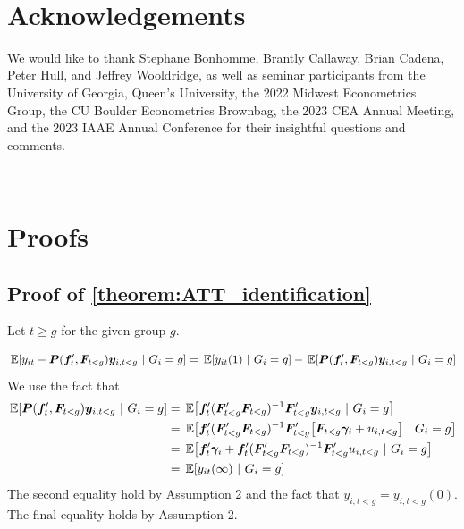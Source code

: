 \documentclass[12pt]{article}
\begin{document}
\newpage~\section*{Acknowledgements}

We would like to thank Stephane Bonhomme, Brantly Callaway, Brian Cadena, Peter Hull, and Jeffrey Wooldridge, as well as seminar participants from the University of Georgia, Queen's University, the 2022 Midwest Econometrics Group, the CU Boulder Econometrics Brownbag, the 2023 CEA Annual Meeting, and the 2023 IAAE Annual Conference for their insightful questions and comments.


\newpage~\appendix

\section{Proofs}\label{sec:proofs}

\subsection*{Proof of \autoref{theorem:ATT_identification}}

Let $t \geq g$ for the given group $g$.

\begin{equation*}
    \E{y_{it} - \bm P(\bm f_{t}', \bm F_{t < g}) \bm y_{i,t < g}}{G_i = g} = \E{y_{it}(1)}{G_i = g} - \E{\bm P(\bm f_{t}', \bm F_{t < g}) \bm y_{i,t < g}}{G_i = g} 
\end{equation*}
We use the fact that 
\begin{align*}
    \E{ \bm P(\bm f_{t}', \bm F_{t < g}) \bm y_{i,t < g} }{G_i = g} 
    &= \E{ \bm f_{t}' (\bm F_{t < g}' \bm F_{t < g})^{-1} \bm F_{t < g}' \bm y_{i,t < g} }{G_i = g} \\
    &= \E{ \bm f_{t}' (\bm F_{t < g}' \bm F_{t < g})^{-1} \bm F_{t < g}' \big[\bm F_{t < g} \bm \gamma_i + u_{i,t < g} \big] }{G_i = g} \\
    &= \E{ \bm f_{t}' \bm \gamma_i + \bm f_{t}' (\bm F_{t < g}' \bm F_{t < g})^{-1} \bm F_{t < g}' u_{i,t < g} }{G_i = g} \\
    &= \E{ y_{it}(\infty) }{G_i = g} 
\end{align*}
The second equality hold by Assumption 2 and the fact that $y_{i,t < g} = y_{i, t < g}(0)$. The final equality holds by Assumption 2.
\end{document}
